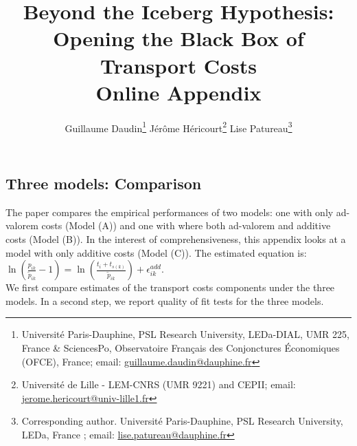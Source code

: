 \documentclass[11pt,twoside, authoryear]{elsarticle}
\begin{document}
\title{\textbf{Beyond the Iceberg Hypothesis: \\Opening the Black Box of Transport Costs}\\Online Appendix}

\author{Guillaume Daudin\footnote{\noindent Universit\'{e} Paris-Dauphine, PSL Research University, LEDa-DIAL, UMR 225, France \&
SciencesPo, Observatoire Français des Conjonctures \'{E}conomiques (OFCE), France; email: \url{guillaume.daudin@dauphine.fr}} \qquad \quad Jérôme Héricourt\footnote{\noindent Université de Lille - LEM-CNRS (UMR 9221) and CEPII; email: \url{jerome.hericourt@univ-lille1.fr}} \qquad \quad Lise Patureau\footnote{\noindent Corresponding author. Universit\'{e} Paris-Dauphine, PSL Research University, LEDa, France ; email: \url{lise.patureau@dauphine.fr}}}



\maketitle






\tableofcontents
\vspace{1cm}
\newpage
\listoftables

\newpage



%
%
%
%
%			
%			
%				
%
%

	\renewcommand\thesubsubsection{\Alph{subsection}.\arabic{subsubsection}}
	
	\renewcommand\thesubsection{\Alph{subsection}}
	
	
\subsection{Three models: Comparison \label{secoa:additive_only}}

The paper compares the empirical performances of two models: one with only ad-valorem costs (Model (A)) and one with where both ad-valorem and additive costs (Model (B)).
In the interest of comprehensiveness, this appendix looks at a model with only additive costs (Model (C)).
The estimated equation is: $\ln\left(\frac{p_{ik}}{\widetilde{p}_{ik}}-1 \right)= \ln \left(\frac{t_{i} + t_{s(k)}}{\widetilde{p}_{ik}}\right) + \epsilon^{add}_{ik}$. \\
We first compare estimates of the transport costs components under the three models. In a second step, we report quality of fit tests for the three models. 
\end{document}
